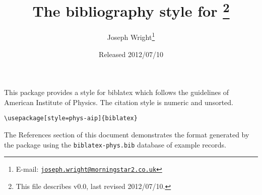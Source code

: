 \documentclass[a4paper]{ltxdoc}
\author{Joseph Wright\thanks{E-mail: 
  \href{mailto:joseph.wright@morningstar2.co.uk}
  {\texttt{joseph.wright@morningstar2.co.uk}}}}
\title{The \pkg{phys-aip} bibliography style for \pkg{biblatex}%
  \footnote{This file describes v0.0, last revised 2012/07/10.}}
\date{Released 2012/07/10}
\providecommand*{\pkg}[1]{\textsf{#1}}
\begin{document}
\maketitle

This package provides a style for \pkg{biblatex} which follows the
guidelines of American Institute of Physics. The citation style is numeric
and unsorted.
\begin{verbatim}
\usepackage[style=phys-aip]{biblatex}
\end{verbatim}
The References section of this document demonstrates the format 
generated by the package using the \texttt{biblatex-phys.bib} database
of example records.

\nocite{*}

\printbibliography
\end{document}
